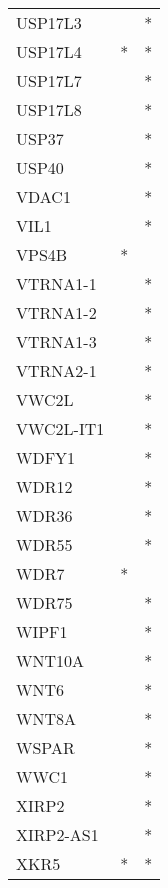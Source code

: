\begin{longtable}{lcc}
USP17L3         &                &          * \\
USP17L4         &              * &          * \\
USP17L7         &                &          * \\
USP17L8         &                &          * \\
USP37           &                &          * \\
USP40           &                &          * \\
VDAC1           &                &          * \\
VIL1            &                &          * \\
VPS4B           &              * &            \\
VTRNA1-1        &                &          * \\
VTRNA1-2        &                &          * \\
VTRNA1-3        &                &          * \\
VTRNA2-1        &                &          * \\
VWC2L           &                &          * \\
VWC2L-IT1       &                &          * \\
WDFY1           &                &          * \\
WDR12           &                &          * \\
WDR36           &                &          * \\
WDR55           &                &          * \\
WDR7            &              * &            \\
WDR75           &                &          * \\
WIPF1           &                &          * \\
WNT10A          &                &          * \\
WNT6            &                &          * \\
WNT8A           &                &          * \\
WSPAR           &                &          * \\
WWC1            &                &          * \\
XIRP2           &                &          * \\
XIRP2-AS1       &                &          * \\
XKR5            &              * &          * \\

\end{longtable}
